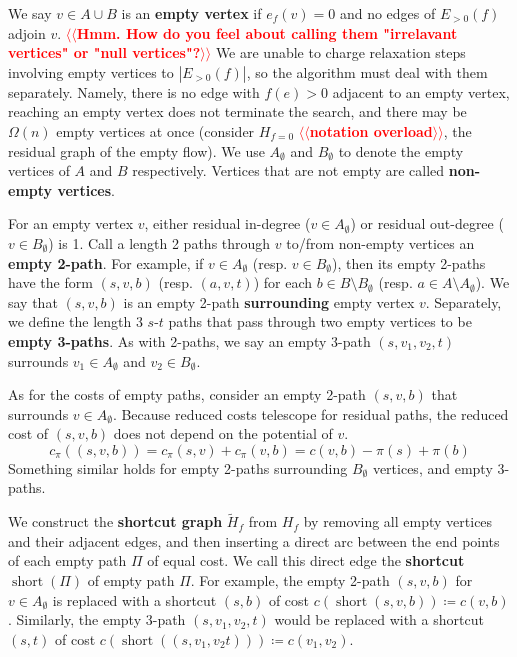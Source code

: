 \documentclass[11pt]{article}
\makeatletter
\theoremstyle{plain}
\numberwithin{figure}{section}
\def\short{\operatorname{short}}
\def\EMPH#1{\textbf{\boldmath #1}}
\def\n@te#1{\textsf{\boldmath \textbf{$\langle\!\langle$#1$\rangle\!\rangle$}}\leavevmode}
\def\note#1{\textcolor{red}{\n@te{#1}}}
\makeatother
\begin{document}
We say $v \in A \cup B$ is an \EMPH{empty vertex} if $e_f(v) = 0$ and no edges
of $E_{>0}(f)$ adjoin $v$.
\note{Hmm. How do you feel about calling them "irrelavant vertices" or "null vertices"?}
We are unable to charge relaxation steps involving empty vertices to
$|E_{>0}(f)|$, so the algorithm must deal with them separately.
Namely, there is no edge with $f(e) > 0$ adjacent to an empty vertex,
reaching an empty vertex does not terminate the search, and there may be
$\Omega(n)$ empty vertices at once (consider $H_{f = 0}$ \note{notation overload}, the residual graph
of the empty flow).
We use $A_\emptyset$ and $B_\emptyset$ to denote the empty vertices of $A$ and
$B$ respectively.
Vertices that are not empty are called \EMPH{non-empty vertices}.

For an empty vertex $v$, either residual in-degree ($v \in A_\emptyset$) or
residual out-degree ($v \in B_\emptyset$) is 1.
Call a length 2 paths through $v$ to/from non-empty vertices an
\EMPH{empty 2-path}.
For example, if $v \in A_\emptyset$ (resp. $v \in B_\emptyset$), then its empty
2-paths have the form $(s, v, b)$ (resp. $(a, v, t)$) for each
$b \in B \setminus B_\emptyset$ (resp. $a \in A \setminus A_\emptyset$).
We say that $(s, v, b)$ is an empty 2-path \EMPH{surrounding} empty vertex $v$.
Separately, we define the length 3 $s$-$t$ paths that pass through two empty
vertices to be \EMPH{empty 3-paths}.
As with 2-paths, we say an empty 3-path $(s, v_1, v_2, t)$ surrounds
$v_1 \in A_\emptyset$ and $v_2 \in B_\emptyset$.

As for the costs of empty paths, consider an empty 2-path $(s, v, b)$ that
surrounds $v \in A_\emptyset$.
Because reduced costs telescope for residual paths, the reduced cost of
$(s, v, b)$ does not depend on the potential of $v$.
\begin{equation*}
	c_\pi((s, v, b)) = c_\pi(s, v) + c_\pi(v, b) = c(v, b) - \pi(s) + \pi(b)
\end{equation*}
Something similar holds for empty 2-paths surrounding $B_\emptyset$ vertices,
and empty 3-paths.

We construct the \EMPH{shortcut graph} $\tilde{H}_f$ from $H_f$ by removing all
empty vertices and their adjacent edges, and then inserting a direct arc
between the end points of each empty path $\Pi$ of equal cost.
We call this direct edge the \EMPH{shortcut} $\short(\Pi)$ of empty path $\Pi$.
For example, the empty 2-path $(s, v, b)$ for $v \in A_\emptyset$ is replaced
with a shortcut $(s, b)$ of cost $c(\short(s, v, b)) \coloneqq c(v, b)$.
Similarly, the empty 3-path $(s, v_1, v_2, t)$ would be replaced with a
shortcut $(s, t)$ of cost $c(\short((s, v_1, v_2 t))) \coloneqq c(v_1, v_2)$.
\end{document}
